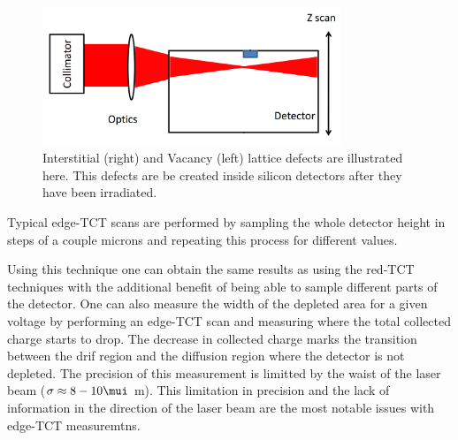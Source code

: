 \begin{figure}[H]
	\centering
	\includegraphics[width=0.8\textwidth]{chap4_eTCT.png}
	\caption{Interstitial (right) and Vacancy (left) lattice defects are illustrated here. This defects are be created inside silicon detectors after they have been irradiated.}
	\label{fig:eTCT}
\end{figure}


Typical edge-TCT scans are performed by sampling the whole detector height in steps of a couple microns and repeating this process for different \vias values.

Using this technique one can obtain the same results as using the red-TCT techniques with the additional benefit of being able to sample different parts of the detector. One can also measure the width of the depleted area for a given voltage by performing an edge-TCT scan and measuring where the total 
collected charge starts to drop. The decrease in collected charge marks the transition between the drif region and the diffusion region where the detector is not depleted. The precision of this measurement is limitted by the waist of the laser beam ($\sigma \approx 8-10\mui$ m). This limitation in precision and the lack of information in the direction of the laser beam are the most notable issues with edge-TCT measuremtns.

